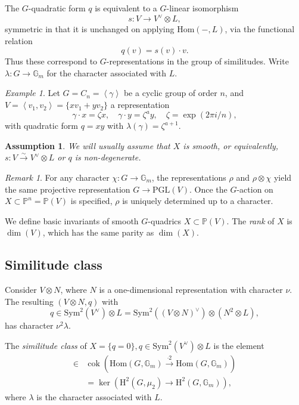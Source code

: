 \documentclass[12pt]{amsart}
\numberwithin{equation}{section}
\newcommand{\lra}{\longrightarrow}
\newcommand{\ra}{\rightarrow}
\newcommand{\bG}{\mathbb{G}}
\newcommand{\bP}{\mathbb{P}}
\newcommand{\rH}{\mathrm{H}}
\newcommand{\cok}{\operatorname{cok}}
\newcommand{\Hom}{\mathrm{Hom}}
\newcommand{\PGL}{\mathrm{PGL}}
\newcommand{\Sym}{\mathrm{Sym}}
\theoremstyle{plain}
\newtheorem{assu}[prop]{Assumption}
\theoremstyle{definition}
\theoremstyle{remark}
\newtheorem{rema}[prop]{Remark}
\newtheorem{exam}[prop]{Example}
\begin{document}
The $G$-quadratic form $q$ is equivalent to a $G$-linear isomorphism
$$s:V \lra V^{\vee}\otimes L,$$
symmetric in that it is unchanged on applying $\Hom(-,L)$,
via the functional relation
$$q(v) = s(v)\cdot v.$$
Thus these correspond to $G$-representations in the group of similitudes.
Write $\lambda:G \rightarrow \bG_m$ for the character associated with $L$.
\begin{exam}
Let $G=C_n=\left<\gamma\right> $ be a cyclic group of order $n$, and $V=\left<v_1,v_2\right>=\{xv_1+yv_2\}$ a
representation
$$\gamma\cdot x=\zeta x, \quad \gamma\cdot y=\zeta^a y, \quad \zeta=\exp(2\pi i/n),$$
with quadratic form $q=xy$ with $\lambda(\gamma)=\zeta^{a+1}$.  
\end{exam}

\begin{assu}
We will usually assume that $X$ is {\em smooth}, or equivalently,
$s:V \stackrel{\sim}{\lra} V^{\vee}\otimes L$
or $q$ is {\em non-degenerate}.  
\end{assu}

\begin{rema}
For any character $\chi:G \rightarrow \bG_m$, the representations $\rho$ and $\rho\otimes \chi$
yield the same projective representation $G \ra \PGL(V)$. 
Once the $G$-action on $X\subset \bP^n=\bP(V)$ is specified, $\rho$ is uniquely determined up to a character. 
\end{rema}

We define basic invariants of smooth $G$-quadrics $X\subset \bP(V)$. The {\em rank} of $X$ is $\dim(V)$,
which has the same parity as $\dim(X)$.



\subsection*{Similitude class}
Consider $V\otimes N$, where $N$ is a one-dimensional representation with character $\nu$. 
The resulting $(V\otimes N,q)$ with
$$q \in \Sym^2(V^{\vee})\otimes L = 
\Sym^2((V\otimes N)^{\vee})\otimes (N^2 \otimes L),$$
has character $\nu^{2} \lambda$.

The {\em similitude class} of $X=\{q=0\}, q\in \Sym^2(V^{\vee})\otimes L$ is the element
\begin{align*}
[\lambda] \in &\cok\left(\Hom(G,\bG_m) \stackrel{\cdot 2}{\lra} \Hom(G,\bG_m)\right) \\
             & = \ker\left( \rH^2(G,\mu_2)\lra \rH^2(G,\bG_m)\right),
\end{align*}
where $\lambda$ is the character associated with $L$.
\end{document}
